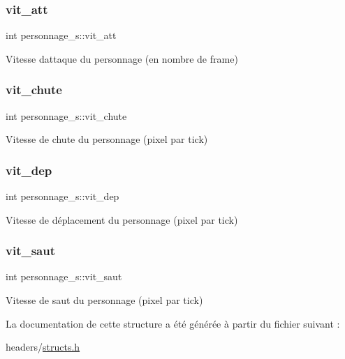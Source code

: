 \subsubsection{\texorpdfstring{vit\+\_\+att}{vit\_att}}
{\footnotesize\ttfamily int personnage\+\_\+s\+::vit\+\_\+att}

Vitesse d\textquotesingle{}attaque du personnage (en nombre de frame) \mbox{\label{structpersonnage__s_a8e340f828bfffa2c47269e315609ed01}} 
\subsubsection{\texorpdfstring{vit\+\_\+chute}{vit\_chute}}
{\footnotesize\ttfamily int personnage\+\_\+s\+::vit\+\_\+chute}

Vitesse de chute du personnage (pixel par tick) \mbox{\label{structpersonnage__s_a6899a0efdc3a3fccb060aaf06b4e4b8d}} 
\subsubsection{\texorpdfstring{vit\+\_\+dep}{vit\_dep}}
{\footnotesize\ttfamily int personnage\+\_\+s\+::vit\+\_\+dep}

Vitesse de déplacement du personnage (pixel par tick) \mbox{\label{structpersonnage__s_abf199b160e1ce327b7def1ed1ee00b39}} 
\subsubsection{\texorpdfstring{vit\+\_\+saut}{vit\_saut}}
{\footnotesize\ttfamily int personnage\+\_\+s\+::vit\+\_\+saut}

Vitesse de saut du personnage (pixel par tick) 

La documentation de cette structure a été générée à partir du fichier suivant \+:\begin{DoxyCompactItemize}
\item 
headers/\hyperlink{structs_8h}{structs.\+h}\end{DoxyCompactItemize}
